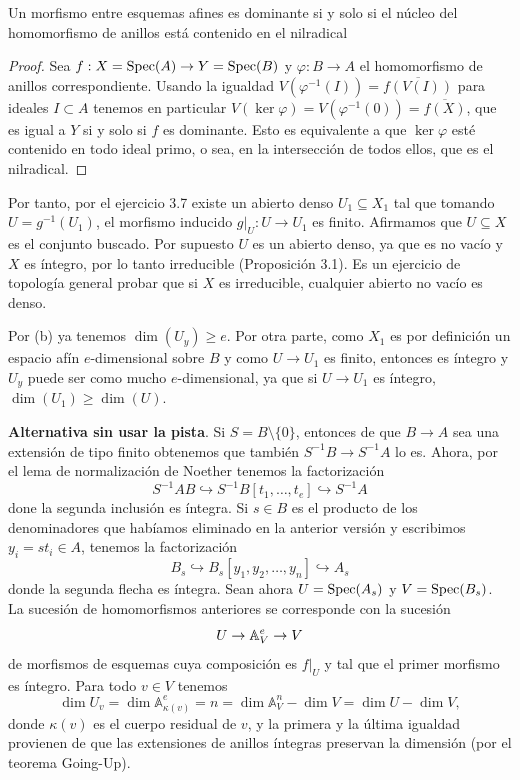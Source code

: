 \documentclass[twoside]{article}
\begin{document}
\begin{solucion}
\begin{enumerate}[(a)]
\begin{lemma}\label{lema1}
Un morfismo entre esquemas afines es dominante si y solo si el núcleo del homomorfismo de anillos está contenido en el nilradical
\end{lemma}
\begin{proof}
Sea $f:X=\operatorname{Spec}(A)\to Y=\operatorname{Spec}(B)$ y $\varphi:B\to A$ el homomorfismo de anillos correspondiente. Usando la igualdad $V(\varphi^{-1}(I))=\overline{f(V(I))}$ para ideales $I\subset A$ tenemos en particular $V(\ker\varphi)=V(\varphi^{-1}(0))=\overline{f(X)}$, que es igual a $Y$ si y solo si $f$ es dominante. Esto es equivalente a que $\ker\varphi$ esté contenido en todo ideal primo, o sea, en la intersección de todos ellos, que es el nilradical. 
\end{proof}

Por tanto, por el ejercicio 3.7 existe un abierto denso $U_1\subseteq X_1$ tal que tomando $U=g^{-1}(U_1)$, el morfismo inducido $g|_U:U\to U_1$ es finito. Afirmamos que $U\subseteq X$ es el conjunto buscado. Por supuesto $U$ es un abierto denso, ya que es no vacío y $X$ es íntegro, por lo tanto irreducible (Proposición 3.1). Es un ejercicio de topología general probar que si $X$ es irreducible, cualquier abierto no vacío es denso. 

Por (b) ya tenemos $\dim(U_y)\geq e$. Por otra parte, como $X_1$ es por definición un espacio afín $e$-dimensional sobre $B$ y como $U\to U_1$ es finito, entonces es íntegro y $U_y$ puede ser como mucho $e$-dimensional, ya que si $U\to U_1$ es íntegro, $\dim(U_1)\geq\dim(U)$.

\textbf{Alternativa sin usar la pista}.
Si $S=B\setminus\{0\}$, entonces de que $B\to A$ sea una extensión de tipo finito obtenemos que también $S^{-1}B\to S^{-1}A$ lo es. Ahora, por el lema de normalización de Noether tenemos la factorización
\[
S^{-1}AB\hookrightarrow S^{-1}B[t_1,\ldots,t_e] \hookrightarrow S^{-1}A
\]
done la segunda inclusión es íntegra. Si $s\in B$ es el producto de los denominadores que habíamos eliminado en la anterior versión y escribimos $y_i=st_i\in A$, tenemos la factorización
\[
B_s \hookrightarrow B_s[y_1,y_2,\ldots,y_n] \hookrightarrow A_s
\]
donde la segunda flecha es íntegra. Sean ahora $U=\operatorname{Spec}(A_s)$ y $V=\operatorname{Spec}(B_s)$. La sucesión de homomorfismos anteriores se corresponde con la sucesión
\[
U\to\mathbb{A}_V^e\to V
\]
de morfismos de esquemas cuya composición es $f|_U$ y tal que el primer morfismo es íntegro. Para todo $v\in V$ tenemos
\[
\dim U_v = \dim \mathbb{A}^e_{\kappa(v)} = n = \dim \mathbb{A}^n_V - \dim V = \dim U - \dim V,
\]
donde $\kappa(v)$ es el cuerpo residual de $v$, y la primera y la última igualdad provienen de que las extensiones de anillos íntegras preservan la dimensión (por el teorema Going-Up). 


\end{enumerate}
\end{solucion}
\end{document}
